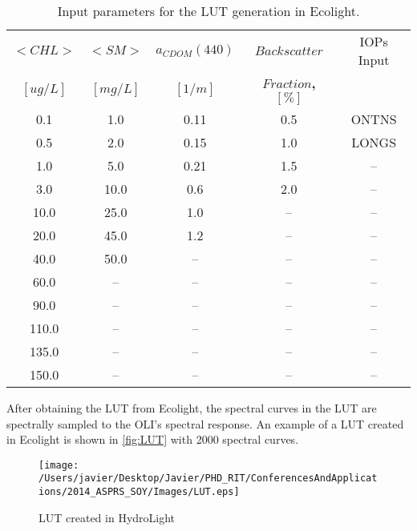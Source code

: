 \begin{table}[htb]
\caption{ Input parameters for the LUT generation in Ecolight. \label{tab:LUTconc2} } 
\centering
		\begin{tabular}{c|c|c|c|c}
        		\bfseries{$<CHL>$}  	& \bfseries{$<SM>$}  & \bfseries{$a_{CDOM}(440)$} & \bfseries{$Backscatter$} & IOPs Input\\
		$[ug/L]$  		& $[mg/L]$ & 	$[1/m]$ &	\bfseries{$Fraction$}, $[\%]$	\\ \hline \hline
0.1   & 1.0  &  0.11 &  0.5 & ONTNS\\
0.5   & 2.0  &  0.15 &  1.0 & LONGS\\
1.0   & 5.0  &  0.21 &  1.5 & --\\
3.0   & 10.0 &  0.6  &  2.0 & --\\
10.0  & 25.0 &  1.0  &  --  & --\\
20.0  & 45.0 &  1.2  &  --  & --\\
40.0  & 50.0 &  --   &  --  & --\\
60.0  & --   &  --   &  --  & --\\  
90.0  & --   &  --   &  --  & --\\  
110.0 & --   &  --   &  --  & --\\  
135.0 & --   &  --   &  --  & --\\  
150.0 & --   &  --   &  --  & --\\     
	 	\end{tabular}
	\end{table}

After obtaining the LUT from Ecolight, the spectral curves in the LUT are spectrally sampled to the OLI's spectral response. An example of a LUT created in Ecolight is shown in \autoref{fig:LUT} with 2000 spectral curves. 

\begin{figure}[htb]
    \centering
      \texttt{[image: /Users/javier/Desktop/Javier/PHD\_RIT/ConferencesAndApplications/2014\_ASPRS\_SOY/Images/LUT.eps]}
      \caption{LUT created in HydroLight}
      \label{fig:LUT}
\end{figure}



